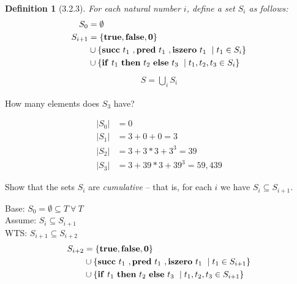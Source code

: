 \documentclass[12pt,letterpaper,boxed]{hmcpset}
\newtheorem{definition}{Definition}[section]
\newcommand{\f}[2]{\textnormal{\textbf{#1}}\ #2\ }
\newcommand{\val}[1]{\textnormal{\textbf{#1}}}
\begin{document}
\problemlist{}

\begin{definition}[3.2.3]
    For each natural number $i$, define a set $S_i$ as follows:
    \begin{align*}
        S_0 &= \emptyset \\
        S_{i+1} &= \{\val{true}, \val{false}, \val{0}\} \\
                &\cup \{\f{succ}{t_1}, \f{pred}{t_1}, \f{iszero}{t_1} \mid t_1 \in S_i \} \\
                &\cup \{\f{if}{t_1} \f{then}{t_2} \f{else}{t_3} \mid t_1, t_2, t_3 \in S_i\}
    \end{align*}
    \begin{align*}
        S = \bigcup_i S_i
    \end{align*}
\end{definition}

\begin{problem}[3.2.4]
How many elements does $S_3$ have?
\end{problem}

\begin{solution}
    \begin{align*}
        |S_0| &= 0 \\
        |S_1| &= 3 + 0 + 0 = 3 \\
        |S_2| &= 3 + 3*3 + 3^3 = 39 \\
        |S_3| &= 3 + 39*3 + 39^3 = 59,439 
    \end{align*}
\end{solution}

\begin{problem}[3.2.5]
Show that the sets $S_i$ are \emph{cumulative} -- that is, for each $i$ we have $S_i \subseteq S_{i+1}$.
\end{problem}

\begin{solution}
    Base: $S_0 = \emptyset \subseteq T\ \forall\ T$ \\
    Assume: $S_i \subseteq S_{i+1}$ \\
    WTS: $S_{i+1} \subseteq S_{i+2}$
    \begin{align*}
        S_{i+2} &= \{\val{true}, \val{false}, \val{0}\} \\
            &\cup \{\f{succ}{t_1}, \f{pred}{t_1}, \f{iszero}{t_1} \mid t_1 \in S_{i+1} \} \\
            &\cup \{\f{if}{t_1} \f{then}{t_2} \f{else}{t_3} \mid t_1, t_2, t_3 \in S_{i+1}\}
    \end{align*}
\end{solution}
\end{document}
